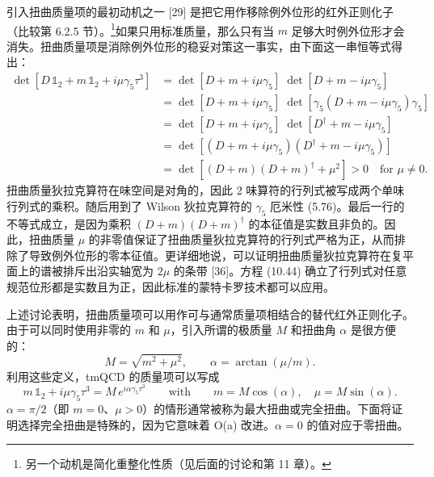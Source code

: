 引入扭曲质量项的最初动机之一 [29] 是把它用作移除例外位形的红外正则化子（比较第 6.2.5 节）。\footnote{另一个动机是简化重整化性质（见后面的讨论和第 11 章）。}如果只用标准质量，那么只有当 $m$ 足够大时例外位形才会消失。扭曲质量项是消除例外位形的稳妥对策这一事实，由下面这一串恒等式得出：
\begin{equation}
  \begin{split}
    \det\left[D\,\mathbb{1}_2 + m\,\mathbb{1}_2 + i\mu\gamma_5\tau^3\right]
    &= \det[D + m + i\mu\gamma_5]\; \det[D + m - i\mu\gamma_5] \\
    &= \det[D + m + i\mu\gamma_5]\;
       \det\left[\gamma_5 (D + m - i\mu\gamma_5)\gamma_5\right] \\
    &= \det[D + m + i\mu\gamma_5]\;
       \det[D^{\dagger} + m - i\mu\gamma_5] \\
    &= \det\left[(D + m + i\mu\gamma_5)(D^{\dagger} + m - i\mu\gamma_5)\right] \\
    &= \det\left[(D + m)(D + m)^{\dagger} + \mu^2\right] > 0
       \quad \text{for } \mu \neq 0 .
  \end{split}
\end{equation}
扭曲质量狄拉克算符在味空间是对角的，因此 2 味算符的行列式被写成两个单味行列式的乘积。随后用到了 Wilson 狄拉克算符的 $\gamma_5$ 厄米性 (5.76)。最后一行的不等式成立，是因为乘积 $(D + m)(D + m)^{\dagger}$ 的本征值是实数且非负的。因此，扭曲质量 $\mu$ 的非零值保证了扭曲质量狄拉克算符的行列式严格为正，从而排除了导致例外位形的零本征值。更详细地说，可以证明扭曲质量狄拉克算符在复平面上的谱被排斥出沿实轴宽为 $2\mu$ 的条带 [36]。方程 (10.44) 确立了行列式对任意规范位形都是实数且为正，因此标准的蒙特卡罗技术都可以应用。

上述讨论表明，扭曲质量项可以用作可与通常质量项相结合的替代红外正则化子。由于可以同时使用非零的 $m$ 和 $\mu$，引入所谓的极质量 $M$ 和扭曲角 $\alpha$ 是很方便的：
\begin{equation}
  M = \sqrt{m^2 + \mu^2} , \qquad \alpha = \arctan(\mu/m) .
\end{equation}
利用这些定义，tmQCD 的质量项可以写成
\begin{equation}
  m\,\mathbb{1}_2 + i\mu\gamma_5\tau^3 = M\, e^{i\alpha\gamma_5\tau^3}
  \qquad \text{with} \qquad
  m = M\cos(\alpha) , \quad \mu = M\sin(\alpha) .
\end{equation}
$\alpha = \pi/2$（即 $m = 0$、$\mu > 0$）的情形通常被称为最大扭曲或完全扭曲。下面将证明选择完全扭曲是特殊的，因为它意味着 O(a) 改进。$\alpha = 0$ 的值对应于零扭曲。

